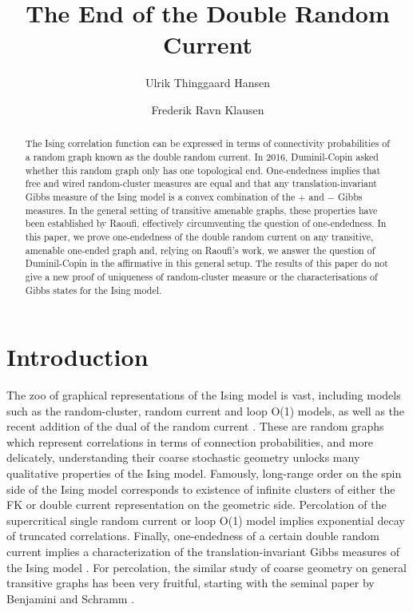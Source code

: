 \documentclass[article,11pt,reqno]{amsart}
\author{Ulrik Thinggaard Hansen}
\author{Frederik Ravn Klausen}
\title{\vspace{-5cm}The End of the Double Random Current}
\begin{document}
\maketitle

\begin{abstract}
The Ising correlation function can be expressed in terms of connectivity probabilities of a random graph known as the double random current. In 2016, Duminil-Copin asked whether this random graph only has one topological end.
One-endedness implies that free and wired random-cluster measures are equal and that any translation-invariant Gibbs measure of the Ising model is a convex combination of the $+$ and $-$ Gibbs measures. In the general setting of transitive amenable graphs, these properties have been established by Raoufi, effectively circumventing the question of one-endedness.
In this paper, we prove one-endedness of the double random current on any transitive, amenable one-ended graph and,
relying on Raoufi's work, we answer the question of Duminil-Copin in the affirmative in this general setup. The results of this paper do not give a new proof of uniqueness of random-cluster measure or the characterisations of Gibbs states for the Ising model.
\end{abstract}

\section{Introduction}
The zoo of graphical representations of the Ising model  is vast, including models such as the random-cluster, random current and loop O(1) models, as well as the recent addition of the dual of the random current \cite{lopez2026ising}. These are random graphs which represent correlations in terms of connection probabilities, and more delicately, understanding their coarse stochastic geometry unlocks many qualitative properties of the Ising model. Famously, long-range order on the spin side of the Ising model corresponds to existence of infinite clusters of either the FK or double current representation on the geometric side.
Percolation of the supercritical single random current  or loop O(1) model implies exponential decay of truncated correlations.
Finally, one-endedness of a certain double random current implies a characterization of the translation-invariant Gibbs measures of the Ising model \cite{raoufi2020translation}. For percolation, the similar study of coarse geometry on general transitive graphs has been very fruitful, starting with the seminal paper by Benjamini and Schramm \cite{BS}.
\end{document}
